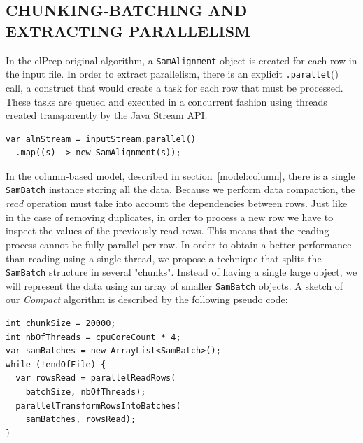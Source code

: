 \documentclass[a4paper,twoside]{article}
\begin{document}
\subsection{\uppercase{Chunking-Batching and Extracting Parallelism}} 
\label{batching}

In the elPrep original algorithm, a {\texttt{SamAlignment}} object is created for each row in the input file.
In order to extract parallelism, there is an explicit {\texttt{.parallel}()} call, a construct that would create a task for each row that must be processed.
These tasks are queued and executed in a concurrent fashion using threads created transparently by the Java Stream API.
\begin{verbatim}
var alnStream = inputStream.parallel()
  .map((s) -> new SamAlignment(s));
\end{verbatim}
In the column-based model, described in section~\ref{model:column}, there is a single {\texttt{SamBatch}} instance storing all the data.
Because we perform data compaction, the {\textit{read}} operation must take into account the dependencies between rows.
Just like in the case of removing duplicates, in order to process a new row we have to inspect the values of the previously read rows.
This means that the reading process cannot be fully parallel per-row.
In order to obtain a better performance than reading using a single thread, we propose a technique that splits the {\texttt{SamBatch}} structure in several "chunks".
Instead of having a single large object, we will represent the data using an array of smaller {\texttt{SamBatch}} objects.
A sketch of our {\textit{Compact}} algorithm is described by the following pseudo code:

\begin{verbatim}
int chunkSize = 20000;
int nbOfThreads = cpuCoreCount * 4;
var samBatches = new ArrayList<SamBatch>();
while (!endOfFile) {
  var rowsRead = parallelReadRows(
    batchSize, nbOfThreads);
  parallelTransformRowsIntoBatches(
    samBatches, rowsRead);
}
\end{verbatim}
\end{document}

